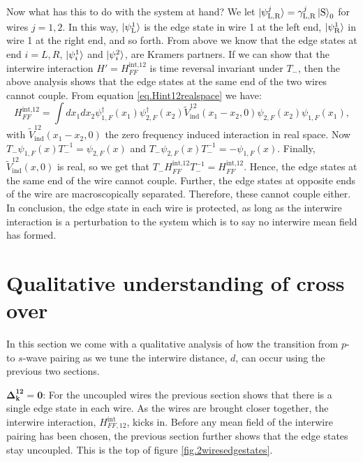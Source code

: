 Now what has this to do with the system at hand? We let $\ket{ \psi^{j}_{\text{L,R}} } = \gamma^{j}_{\text{L,R}}\ket{\text{S}}_0$ for wires $j = 1, 2$. In this way, $\ket{\psi^{1}_{\text{L}}}$ is the edge state in wire 1 at the left end, $\ket{\psi^{1}_{\text{R}}}$ in wire 1 at the right end, and so forth. From above we know that the edge states at end $i = L, R$, $\ket{\psi^1_{i}}$ and $\ket{\psi^2_{i}}$, are Kramers partners. If we can show that the interwire interaction $H' = H^\text{int,12}_{FF}$ is time reversal invariant under $T_-$, then the above analysis shows that the edge states at the same end of the two wires cannot couple. From equation \eqref{eq.Hint12realspace} we have:
\begin{equation}
H^\text{int,12}_{FF} = \int dx_1 dx_2 \psi^\dagger_{1,F}(x_1)\psi^\dagger_{2,F}(x_2) \tilde{V}_{\text{ind}}^{12}(x_1-x_2,0) \psi_{2,F}(x_2)\psi_{1,F}(x_1),
\end{equation}
with $\tilde{V}_{\text{ind}}^{12}(x_1-x_2,0)$ the zero frequency induced interaction in real space. Now $T_-\psi_{1,F}(x)T^{-1}_- = \psi_{2,F}(x)$ and $T_-\psi_{2,F}(x)T^{-1}_- = -\psi_{1,F}(x)$. Finally, $\tilde{V}_{\text{ind}}^{12}(x, 0)$ is real, so we get that $T_-H^\text{int,12}_{FF}T_-^{-1} = H^\text{int,12}_{FF}$. Hence, the edge states at the same end of the wire cannot couple. Further, the edge states at opposite ends of the wire are macroscopically separated. Therefore, these cannot couple either. In conclusion, the edge state in each wire is protected, as long as the interwire interaction is a perturbation to the system which is to say no interwire mean field has formed.  

\section{Qualitative understanding of cross over}
\label{sec.2wirestransitionqualitative}
In this section we come with a qualitative analysis of how the transition from $p$- to $s$-wave pairing as we tune the interwire distance, $d$, can occur using the previous two sections. 

$\mathbf{\Delta^{12}_k = 0}$: For the uncoupled wires the previous section shows that there is a single edge state in each wire. As the wires are brought closer together, the interwire interaction, $H^\text{int}_{FF,12}$, kicks in. Before any mean field of the interwire pairing has been chosen, the previous section further shows that the edge states stay uncoupled. This is the top of figure \ref{fig.2wiresedgestates}. 

